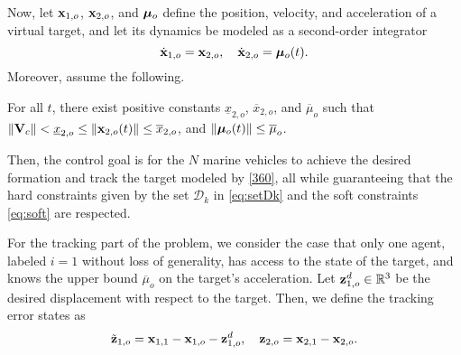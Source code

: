 Now, let $\mathbf{x}_{1, o}$, $\mathbf{x}_{2, o}$, and $\bm{\mu}_o$ define the position, velocity, and acceleration of a virtual target, and let its dynamics be modeled as a second-order integrator
\begin{equation}\label{360}
\dot{\mathbf{x}}_{1, o} = \mathbf{x}_{2, o},\quad
\dot{\mathbf{x}}_{2, o} = \bm{\mu}_o(t).
\end{equation}
Moreover, assume the following.
\begin{asm}\label{hyp:target}
	For all $t$, there exist positive constants $\underline{x}_{2, o}$, $\overline{x}_{2, o}$, and $\overline{\mu}_o$ such that $\left\|\mathbf{V}_c\right\| < \underline{x}_{2, o}\leq \left\|\mathbf{x}_{2, o}(t)\right\| \leq \overline{x}_{2, o}$, and $\left\|\bm{\mu}_o(t)\right\|\leq \overline{\mu}_o$.
\end{asm}

Then, the control goal is for the $N$ marine vehicles to achieve the desired formation and track the target modeled by \eqref{360}, all while guaranteeing that the hard constraints given by the set $\mathcal{D}_k$ in \eqref{eq:setDk} and the soft constraints \eqref{eq:soft} are respected.

For the tracking part of the problem, we consider the case that only one agent, labeled $i=1$ without loss of generality, has access to the state of the target, and knows the upper bound $\overline{\mu}_o$ on the target's acceleration.
Let $\mathbf{z}_{1, o}^d \in \mathbb{R}^3$ be the desired displacement with respect to the target. Then, we define the tracking error states as
\begin{equation}\label{367}
\tilde{\mathbf{z}}_{1, o} = \mathbf{x}_{1, 1} - \mathbf{x}_{1, o} - \mathbf{z}_{1, o}^d, \quad
\mathbf{z}_{2, o}= \mathbf{x}_{2, 1} - \mathbf{x}_{2, o}.
\end{equation}

